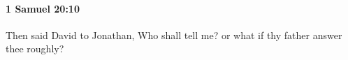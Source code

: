 
		\paragraph{1 Samuel 20:10} %
			\label{1SAMUEL-20-10}

			Then said David to Jonathan, Who shall tell me? or what if thy father answer thee roughly?


